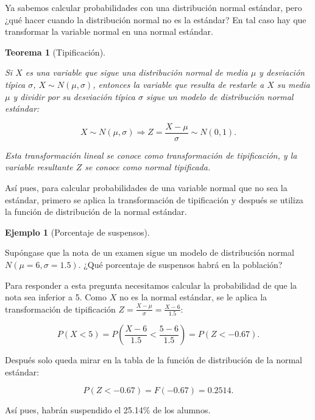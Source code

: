\documentclass[
  spanish,
  a4paper,
]{scrreport}
\theoremstyle{plain}
\newtheorem{theorem}{Teorema}[chapter]
\theoremstyle{definition}
\newtheorem{example}{Ejemplo}[chapter]
\theoremstyle{definition}
\theoremstyle{remark}
\begin{document}
Ya sabemos calcular probabilidades con una distribución normal estándar,
pero ¿qué hacer cuando la distribución normal no es la estándar? En tal
caso hay que transformar la variable normal en una normal estándar.

\begin{theorem}[Tipificación]\protect\hypertarget{thm-tipificacion}{}\label{thm-tipificacion}

Si \(X\) es una variable que sigue una distribución normal de media
\(\mu\) y desviación típica \(\sigma\), \(X\sim N(\mu,\sigma)\),
entonces la variable que resulta de restarle a \(X\) su media \(\mu\) y
dividir por su desviación típica \(\sigma\) sigue un modelo de
distribución normal estándar:

\[
X\sim N(\mu,\sigma) \Rightarrow Z=\frac{X-\mu}{\sigma}\sim N(0,1).
\]

Esta transformación lineal se conoce como \emph{transformación de
tipificación}, y la variable resultante \(Z\) se conoce como
\emph{normal tipificada}.

\end{theorem}

Así pues, para calcular probabilidades de una variable normal que no sea
la estándar, primero se aplica la transformación de tipificación y
después se utiliza la función de distribución de la normal estándar.

\begin{example}[Porcentaje de
suspensos]\protect\hypertarget{exm-tipificacion-notas}{}\label{exm-tipificacion-notas}

Supóngase que la nota de un examen sigue un modelo de distribución
normal \(N(\mu=6,\sigma=1.5)\). ¿Qué porcentaje de suspensos habrá en la
población?

Para responder a esta pregunta necesitamos calcular la probabilidad de
que la nota sea inferior a 5. Como \(X\) no es la normal estándar, se le
aplica la transformación de tipificación
\(Z=\displaystyle \frac{X-\mu}{\sigma} = \frac{X-6}{1.5}\):

\[
P(X<5) = P\left(\frac{X-6}{1.5}<\frac{5-6}{1.5}\right) = P(Z<-0.67).
\]

Después solo queda mirar en la tabla de la función de distribución de la
normal estándar:

\[
P(Z<-0.67) = F(-0.67) = 0.2514.
\]

Así pues, habrán suspendido el 25.14\% de los alumnos.

\end{example}
\end{document}
